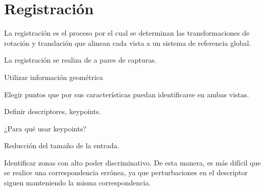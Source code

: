 \section{Registración}
La registración es el proceso por el cual se determinan las transformaciones de rotación y translación
que alinean cada vista a un sistema de referencia global.

La registración se realiza de a pares de capturas.

Utilizar información geométrica

Elegir puntos que por sus características puedan identificarse en ambas vistas.

Definir descriptores, keypoints.

¿Para qué usar keypoints?

Reducción del tamaño de la entrada.

Identificar zonas con alto poder discriminativo. De esta manera, es más difícil que se realice una correspondencia errónea,
ya que perturbaciones en el descriptor siguen manteniendo la misma correspondencia.



